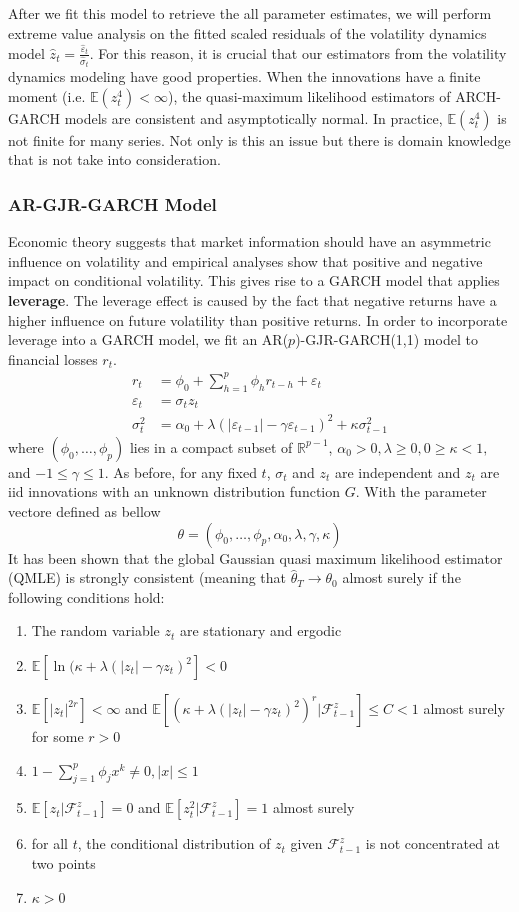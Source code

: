 \documentclass{article}
\theoremstyle{definition}
\theoremstyle{definition}
\def\E{\mathbb{E}}
\def\f{\mathcal{F}}
\begin{document}
\noindent After we fit this model to retrieve the all parameter estimates, we will perform extreme value analysis on the fitted scaled residuals of the volatility dynamics model $\hat{z}_t= \frac{\hat{\varepsilon}_t}{\hat{\sigma}_t}$. For this reason, it is crucial that our estimators from the volatility dynamics modeling have good properties. When the innovations have a finite moment (i.e. $\E(z_t^4)<\infty$), the quasi-maximum likelihood estimators of ARCH-GARCH models are consistent and asymptotically normal. In practice, $\E(z_t^4)$ is not finite for many series. Not only is this an issue but there is domain knowledge that is not take into consideration.
\subsubsection{AR-GJR-GARCH Model}
 Economic theory suggests that market information should have an asymmetric influence on volatility and empirical analyses show that positive and negative impact on conditional volatility. This gives rise to a GARCH model that applies \textbf{leverage}. The leverage effect is caused by the fact that negative returns have a higher influence on future volatility than positive returns. In order to incorporate leverage into a GARCH model, we fit an AR($p$)-GJR-GARCH(1,1) model to financial losses $r_t$. 
 \begin{align*}
     r_t&= \phi_0+\sum_{h=1}^p\phi_hr_{t-h}+ \varepsilon_t\\
     \varepsilon_t&= \sigma_tz_t\\
     \sigma_t^2&= \alpha_0+\lambda(|\varepsilon_{t-1}|-\gamma\varepsilon_{t-1})^2+\kappa\sigma_{t-1}^2
 \end{align*}
 where $(\phi_0,\hdots,\phi_p)$ lies in a compact subset of $\mathbb{R}^{p-1}$, $\alpha_0>0, \lambda\geq 0, 0\geq \kappa <1,$ and $-1\leq \gamma\leq 1$. As before, for any fixed $t$, $\sigma_t$ and $z_t$ are independent and $z_t$ are iid innovations with an unknown distribution function $G$. With the parameter vectore defined as bellow
\[\theta=(\phi_0, \hdots, \phi_p, \alpha_0, \lambda, \gamma, \kappa)\]
It has been shown that the global Gaussian quasi maximum likelihood estimator (QMLE) is strongly consistent (meaning that $\hat\theta_T \rightarrow \theta_0$ almost surely if the following conditions hold:
\begin{enumerate}
    \item The random variable $z_t$ are stationary and ergodic
    \item $\E[\ln(\kappa+\lambda(|z_t|-\gamma z_t)^2]<0$
    \item $\E[|z_t|^{2r}]<\infty$ and $\E[(\kappa+\lambda(|z_t|-\gamma z_t)^2)^r|\f_{t-1}^z]\leq C <1$ almost surely for some $r>0$
    \item $1-\sum_{j=1}^p \phi_jx^k\neq0, |x|\leq 1$
    \item $\E[z_t|\f_{t-1}^z]=0$ and  $\E[z_t^2|\f_{t-1}^z]=1$ almost surely
    \item for all $t$, the conditional distribution of $z_t$ given $\f^z_{t-1}$ is not
concentrated at two points
    \item $\kappa>0$
\end{enumerate}
\end{document}
